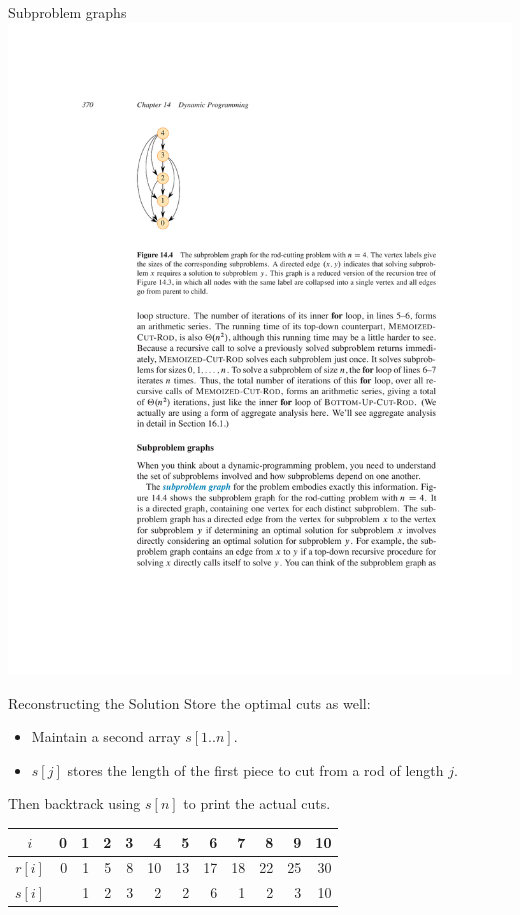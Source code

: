 \documentclass{beamer}
\begin{document}
\begin{frame}{Subproblem graphs}
    \centering
    \includegraphics[width=\textwidth,clip=true,trim=5cm 16cm 3cm 4cm]{figures/p370}
\end{frame}

\begin{frame}{Reconstructing the Solution}
    Store the optimal cuts as well:

    \begin{itemize}
        \item Maintain a second array $s[1..n]$.
        \item $s[j]$ stores the length of the first piece to cut from a rod of length $j$.
    \end{itemize}

    Then backtrack using $s[n]$ to print the actual cuts.\\
    \bigskip
    \begin{tabular}{c | r r r r r r r r r r r }
        $i$ & 0 & 1 & 2 & 3 & 4 & 5 & 6 & 7 & 8 & 9 & 10 \\ \hline
        $r[i]$ & 0 & 1 & 5 & 8 & 10 & 13 & 17 & 18 & 22 & 25 & 30 \\
        $s[i]$ &   & 1 & 2 & 3 & 2 & 2 & 6 & 1 & 2 & 3 & 10 \\
    \end{tabular}
\end{frame}
\end{document}
